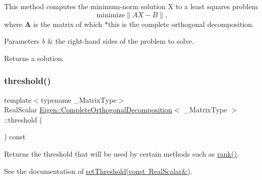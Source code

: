 This method computes the minimum-\/norm solution X to a least squares problem \[\mathrm{minimize} \|A X - B\|, \] where {\bfseries{A}} is the matrix of which {\ttfamily $\ast$this} is the complete orthogonal decomposition.


\begin{DoxyParams}{Parameters}
{\em b} & the right-\/hand sides of the problem to solve.\\
\hline
\end{DoxyParams}
\begin{DoxyReturn}{Returns}
a solution. 
\end{DoxyReturn}
\mbox{\label{class_eigen_1_1_complete_orthogonal_decomposition_a3909f07268496c0f08f1b57331d91075}} 
\subsubsection{\texorpdfstring{threshold()}{threshold()}}
{\footnotesize\ttfamily template$<$typename \+\_\+\+Matrix\+Type$>$ \\
Real\+Scalar \mbox{\hyperlink{class_eigen_1_1_complete_orthogonal_decomposition}{Eigen\+::\+Complete\+Orthogonal\+Decomposition}}$<$ \+\_\+\+Matrix\+Type $>$\+::threshold (\begin{DoxyParamCaption}{ }\end{DoxyParamCaption}) const\hspace{0.3cm}{\ttfamily [inline]}}

Returns the threshold that will be used by certain methods such as \mbox{\hyperlink{class_eigen_1_1_complete_orthogonal_decomposition_af348f64b26f8467a020062c22b748806}{rank()}}.

See the documentation of \mbox{\hyperlink{class_eigen_1_1_complete_orthogonal_decomposition_aa9c9f7cbde9d58ca5552381b70ad8d82}{set\+Threshold(const Real\+Scalar\&)}}. \mbox{\label{class_eigen_1_1_complete_orthogonal_decomposition_a0b28c24992d313d4b04d109dcc7e5220}} 
